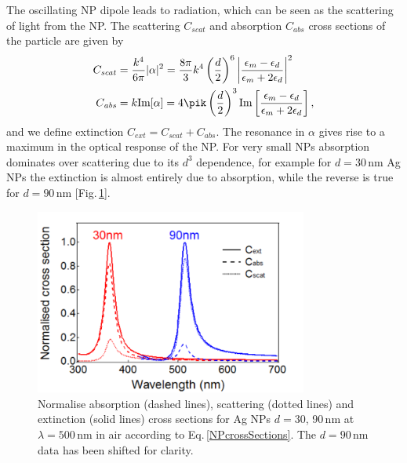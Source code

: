 The oscillating NP dipole leads to radiation, which can be seen as the scattering of light from the NP. The scattering $C_{\mathit{scat}}$ and absorption $C_{\mathit{abs}}$ cross sections of the particle are given by
\begin{subequations}
\label{NPcrossSections}
\begin{align}
C_{\mathit{scat}} &= \frac{k^4}{6\pi}|\alpha|^2 = \frac{8\pi}{3}k^4\left(\frac{d}{2}\right)^6 \left|\frac{\epsilon_m-\epsilon_d}{\epsilon_m+2\epsilon_d}\right|^2 \label{Scat}\\
C_{\mathit{abs}} &= k\textrm{Im}[\alpha] = 4\pik\left(\frac{d}{2}\right)^3\textrm{Im}\left[\frac{\epsilon_m-\epsilon_d}{\epsilon_m+2\epsilon_d}\right] \label{abs} ,
\end{align}
\end{subequations}
and we define extinction $C_{\mathit{ext}} = C_{\mathit{scat}}+C_{\mathit{abs}}$. The resonance in $\alpha$ gives rise to a maximum in the optical response of the NP. For very small NPs absorption dominates over scattering due to its $d^3$ dependence, for example for $d=30$\,nm Ag NPs the extinction is almost entirely due to absorption, while the reverse is true for $d=90$\,nm [Fig.\,\ref{3Fig8}].
\begin{figure}[h!] 
\centering    
\includegraphics[width=0.8\textwidth]{Fig8}
\caption{Normalise absorption (dashed lines), scattering (dotted lines) and extinction (solid lines) cross sections for Ag NPs $d=30$, 90\,nm at $\lambda=500$\,nm in air according to Eq.\,\ref{NPcrossSections}. The $d=90$\,nm data has been shifted for clarity.}
\label{3Fig8}
\end{figure}

